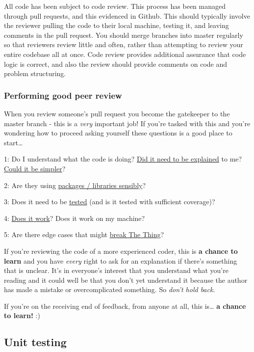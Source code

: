 \documentclass[]{book}
\begin{document}
All code has been subject to code review.
This process has been managed through pull requests, and this evidenced in Github. This should typically involve the reviewer pulling the code to their local machine, testing it, and leaving comments in the pull request.
You should merge branches into master regularly so that reviewers review little and often, rather than attempting to review your entire codebase all at once.
Code review provides additional assurance that code logic is correct, and also the review should provide comments on code and problem structuring.

\hypertarget{performing-good-peer-review}{%
\subsubsection*{Performing good peer review}\label{performing-good-peer-review}}

When you review someone's pull request you become the gatekeeper to the master branch - this is a \emph{very} important job! If you're tasked with this and you're wondering how to proceed asking yourself these questions is a good place to start\ldots{}

1: Do I understand what the code is doing? \protect\hyperlink{users}{Did it need to be explained} to me? \protect\hyperlink{ccc}{Could it be simpler}?

2: Are they using \protect\hyperlink{defaults}{packages / libraries sensibly}?

3: Does it need to be \protect\hyperlink{ccc}{tested} (and is it tested with sufficient coverage)?

4: \protect\hyperlink{ccc}{Does it work}? Does it work on my machine?

5: Are there edge cases that might \protect\hyperlink{errors}{break The Thing}?

If you're reviewing the code of a more experienced coder, this is \textbf{a chance to learn} and you have \emph{every} right to ask for an explanation if there's something that is unclear. It's in everyone's interest that you understand what you're reading and it could well be that you don't yet understand it because the author has made a mistake or overcomplicated something. So \emph{don't hold back}.

If you're on the receiving end of feedback, from anyone at all, this is\ldots{} \textbf{a chance to learn!} :)

\hypertarget{unittest}{%
\subsection{Unit testing}\label{unittest}}
\end{document}
